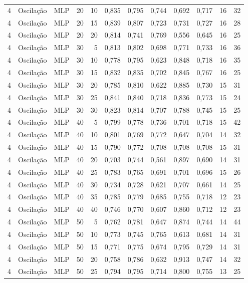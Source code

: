 \begin{longtable}{@{}rllrrrrrrrrr@{}}
4 & Oscilação & MLP & 20 & 10 & 0,835 & 0,795 & 0,744 & 0,692 & 0,717 & 16 & 32 \\
4 & Oscilação & MLP & 20 & 15 & 0,839 & 0,807 & 0,723 & 0,731 & 0,727 & 16 & 28 \\
4 & Oscilação & MLP & 20 & 20 & 0,814 & 0,741 & 0,769 & 0,556 & 0,645 & 16 & 25 \\
4 & Oscilação & MLP & 30 & 5 & 0,813 & 0,802 & 0,698 & 0,771 & 0,733 & 16 & 36 \\
4 & Oscilação & MLP & 30 & 10 & 0,778 & 0,795 & 0,623 & 0,848 & 0,718 & 16 & 35 \\
4 & Oscilação & MLP & 30 & 15 & 0,832 & 0,835 & 0,702 & 0,845 & 0,767 & 16 & 25 \\
4 & Oscilação & MLP & 30 & 20 & 0,785 & 0,810 & 0,622 & 0,885 & 0,730 & 15 & 31 \\
4 & Oscilação & MLP & 30 & 25 & 0,841 & 0,840 & 0,718 & 0,836 & 0,773 & 15 & 24 \\
4 & Oscilação & MLP & 30 & 30 & 0,823 & 0,814 & 0,707 & 0,788 & 0,745 & 15 & 25 \\
4 & Oscilação & MLP & 40 & 5 & 0,799 & 0,778 & 0,736 & 0,701 & 0,718 & 15 & 42 \\
4 & Oscilação & MLP & 40 & 10 & 0,801 & 0,769 & 0,772 & 0,647 & 0,704 & 14 & 32 \\
4 & Oscilação & MLP & 40 & 15 & 0,790 & 0,772 & 0,708 & 0,708 & 0,708 & 15 & 31 \\
4 & Oscilação & MLP & 40 & 20 & 0,703 & 0,744 & 0,561 & 0,897 & 0,690 & 14 & 31 \\
4 & Oscilação & MLP & 40 & 25 & 0,783 & 0,765 & 0,691 & 0,701 & 0,696 & 15 & 26 \\
4 & Oscilação & MLP & 40 & 30 & 0,734 & 0,728 & 0,621 & 0,707 & 0,661 & 14 & 25 \\
4 & Oscilação & MLP & 40 & 35 & 0,785 & 0,779 & 0,685 & 0,755 & 0,718 & 12 & 23 \\
4 & Oscilação & MLP & 40 & 40 & 0,746 & 0,770 & 0,607 & 0,860 & 0,712 & 12 & 23 \\
4 & Oscilação & MLP & 50 & 5 & 0,762 & 0,781 & 0,647 & 0,874 & 0,744 & 14 & 44 \\
4 & Oscilação & MLP & 50 & 10 & 0,773 & 0,745 & 0,765 & 0,613 & 0,681 & 14 & 31 \\
4 & Oscilação & MLP & 50 & 15 & 0,771 & 0,775 & 0,674 & 0,795 & 0,729 & 14 & 31 \\
4 & Oscilação & MLP & 50 & 20 & 0,758 & 0,786 & 0,632 & 0,913 & 0,747 & 14 & 32 \\
4 & Oscilação & MLP & 50 & 25 & 0,794 & 0,795 & 0,714 & 0,800 & 0,755 & 13 & 25 \\

\end{longtable}
